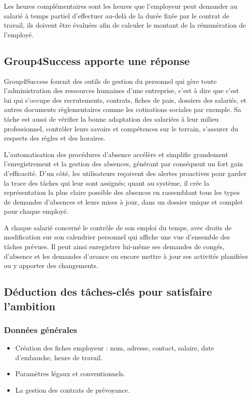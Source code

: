 Les heures complémentaires sont les heures que l'employeur peut demander au salarié à temps partiel d'effectuer au-delà de la durée fixée par le contrat de travail, ils doivent être évaluées afin de calculer le montant de la rémunération de l'employé.

\subsection{Group4Success apporte une réponse}
Group4Success fournit des outils de gestion du personnel qui gère toute l'administration des ressources humaines d'une entreprise, c'est à dire que c'est lui qui s'occupe des recrutements, contrats, fiches de paie, dossiers des salariés, et autres documents règlementaires comme les cotisations sociales par exemple. Sa tâche est aussi de vérifier la bonne adaptation des salariées à leur milieu professionnel, contrôler leurs savoirs et compétences sur le terrain, s'assurer du respects des règles et des horaires.
\medskip

L'automatisation des procédures d'absence accélère et simplifie grandement l'enregistrement et la gestion des absences, générant par conséquent un fort gain d'efficacité. D'un côté, les utilisateurs reçoivent des alertes proactives pour garder la trace des tâches qui leur sont assignés; quant au système, il crée la représentation la plus claire possible des absences en rassemblant tous les types de demandes d'absences et leurs mises à jour, dans un dossier unique et complet pour chaque employé.
\medskip

A chaque salarié concerné le contrôle de son emploi du temps, avec droits de modification sur son calendrier personnel qui affiche une vue d'ensemble des tâches prévues. Il peut ainsi enregistrer lui-même ses demandes de congés, d'absence et les demandes d'avance ou encore mettre à jour ses activités planifiées ou y apporter des changements.
\medskip

\subsection{Déduction des tâches-clés pour satisfaire l'ambition}
\subsubsection{Données générales}
\begin{itemize}
	\item[\textbullet] Création des fiches employeur : nom, adresse, contact, salaire, date d'embauche, heure de travail.
	\item[\textbullet] Paramètres légaux et conventionnels.
	\item[\textbullet] La gestion des contrats de prévoyance.
\end{itemize}

